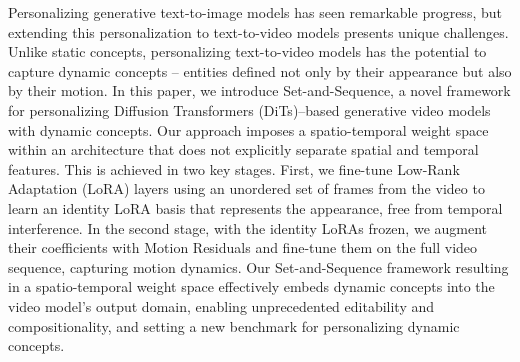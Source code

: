 Personalizing generative text-to-image models has seen remarkable progress, but extending this personalization to text-to-video models presents unique challenges. Unlike static concepts, personalizing text-to-video models has the potential to capture dynamic concepts -- entities defined not only by their appearance but also by their motion.
%
In this paper, we introduce Set-and-Sequence, a novel framework for personalizing Diffusion Transformers (DiTs)–based generative video models with dynamic concepts. Our approach imposes a spatio-temporal weight space within an architecture that does not explicitly separate spatial and temporal features. This is achieved in two key stages. First, we fine-tune Low-Rank Adaptation (LoRA) layers using an unordered set of frames from the video to learn an identity LoRA basis that represents the appearance, free from temporal interference. In the second stage, with the identity LoRAs frozen, we augment their coefficients with Motion Residuals and fine-tune them on the full video sequence, capturing motion dynamics.
%
Our Set-and-Sequence framework resulting in a spatio-temporal weight space effectively embeds dynamic concepts into the video model’s output domain, enabling unprecedented editability and compositionality, and setting a new benchmark for personalizing dynamic concepts.